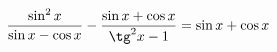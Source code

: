 \begin{ex}[type=prove_identity]
	\begin{condition}
		\( \dfrac{\sin^2x}{\sin x-\cos x}-\dfrac{\sin x+\cos x}{\tg^2x-1}=\sin x+\cos x \)
	\end{condition}
\end{ex}